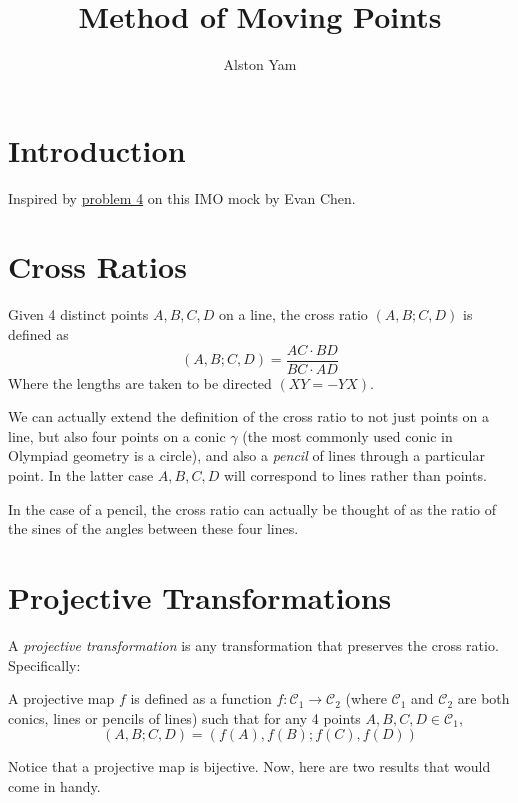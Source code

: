 \documentclass{article}
\title{Method of Moving Points}
\author{Alston Yam}
\date{}
\theoremstyle{mytheoremstyle}
\theoremstyle{mytheoremstyle}
\theoremstyle{myproblemstyle}
\begin{document}
    \maketitle

    \section{Introduction}
    Inspired by \href{https://web.evanchen.cc/static/mop/mockimo/2020.pdf}{problem 4} on this IMO mock by Evan Chen.

    \section{Cross Ratios}
    \begin{definition}
        Given 4 distinct points $A, B, C, D$ on a line, the cross ratio $(A, B; C, D)$ is defined as \[(A, B; C, D) = \frac{AC \cdot BD}{BC \cdot AD}\]
        Where the lengths are taken to be directed $(XY = -YX)$.
    \end{definition}

    We can actually extend the definition of the cross ratio to not just points on a line, but also four points on a conic $\gamma$ (the most commonly used conic in Olympiad geometry is a circle), and also a \textit{pencil} of lines through a particular point. In the latter case $A, B, C, D$ will correspond to lines rather than points.

    In the case of a pencil, the cross ratio can actually be thought of as the ratio of the sines of the angles between these four lines. 

    \section{Projective Transformations}

    A \textit{projective transformation} is any transformation that preserves the cross ratio. Specifically:

    \begin{definition}
        A projective map $f$ is defined as a function $f:\mathcal{C}_1 \to \mathcal{C}_2$ (where $\mathcal{C}_1$ and $\mathcal{C}_2$ are both conics, lines or pencils of lines) such that for any 4 points $A, B, C, D \in \mathcal{C}_1$, \[(A, B; C, D) = (f(A), f(B); f(C), f(D))\]
    \end{definition}

    Notice that a projective map is bijective. Now, here are two results that would come in handy.
\end{document}
